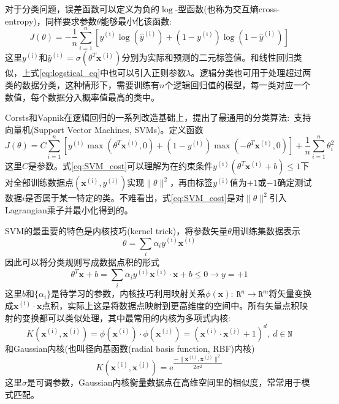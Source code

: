 对于分类问题，误差函数可以定义为负的$\log$-型函数(也称为交互熵\textrm{cross-entropy})，同样要求参数$\theta$能够最小化该函数:
\begin{equation}
	J(\theta) = -\dfrac1n\sum_{i=1}^n[y^{(\mathrm{i})}\log(\hat{y}^{(\mathrm{i})})+(1-y^{(\mathrm{i})})\log(1-\hat{y}^{(\mathrm{i})})]
	\label{eq:logstical_eq}
\end{equation}
这里$y^{(\mathrm{i})}$和$\hat{y}^{(\mathrm{i})}=\sigma(\theta^T\mathbf{x}^{(\mathrm{i})})$分别为实际和预测的二元标签值。和线性回归类似，上式\ref{eq:logstical_eq}中也可以引入正则参数$\lambda$。逻辑分类也可用于处理超过两类的数据分类，这种情形下，需要训练有$n$个逻辑回归值的模型，每一类对应一个数值，每个数据分入概率值最高的类中。

\textrm{Corsts}和\textrm{Vapnik}在逻辑回归的一系列改造基础上，提出了最通用的分类算法:~支持向量机\textrm{(Support Vector Machines, SVMs)}\cite{ML20-273_1995}。定义函数
\begin{equation}
	J(\theta)=C\sum_{i=1}^n[y^{(\mathrm{i})}\max(\theta^T\mathbf{x}^{(\mathrm{i})},0)+(1-y^{(\mathrm{i})})\max(-\theta^T\mathbf{x}^{(\mathrm{i})},0)]+\dfrac1n\sum_{i=1}^n\theta_i^2
	\label{eq:SVM_cost}
\end{equation}
这里$C$是参数。式\eqref{eq:SVM_cost}可以理解为在约束条件$y^{(\mathrm{i})}(\theta^T\mathbf{x}^{(\mathrm{i})}+b)\leqslant1$下对全部训练数据点$(\mathbf{x}^{(\mathrm{i})},y^{(\mathrm{i})})$实现$\|\theta\|^2$，再由标签$y^{(\mathrm{i})}$值为$+1$或$-1$确定测试数据$i$是否属于某一特定的类。不难看出，式\eqref{eq:SVM_cost}是对$\|\theta\|^2$引入\textrm{Lagrangian}乘子并最小化得到的。

\textrm{SVM}的最重要的特色是内核技巧\textrm{(kernel trick)}，将参数矢量$\theta$用训练集数据表示
\begin{displaymath}
	\theta=\sum_i\alpha_iy^{(\mathrm{i})}\mathbf{x}^{(\mathrm{i})}
\end{displaymath}
因此可以将分类规则写成数据点积的形式
\begin{equation}
	\theta^T\mathbf{x}+b=\sum_i\alpha_iy^{(\mathrm{i})}\mathbf{x}^{(\mathrm{i})}\cdot\mathbf{x}+b\leqslant0\rightarrow y=+1
	\label{eq:SVM_cp}
\end{equation}
这里$b$和$\{\alpha_i\}$是待学习的参数，内核技巧利用映射关系$\phi(\mathbf{x}):~\mathtt{R}^n\rightarrow\mathtt{R}^m$将矢量变换成$\mathbf{x}^{(\mathrm{i})}\cdot\mathbf{x}$点积，实际上这是将数据点映射到更高维度的空间中。所有矢量点积映射的变换都可以类似处理，其中最常用的内核为多项式内核:
\begin{displaymath}
	K(\mathbf{x}^{(\mathrm{i})},\mathbf{x}^{(\mathrm{j})})=\phi(\mathbf{x}^{(\mathrm{i})})\cdot\phi(\mathbf{x}^{(\mathrm{j})})=(\mathbf{x}^{(\mathrm{i})}\cdot\mathbf{x}^{(\mathrm{j})}+1)^d,~d\in\mathtt{N}
\end{displaymath}
和\textrm{Gaussian}内核(也叫径向基函数(\textrm{radial basis function, RBF})内核)
\begin{displaymath}
	K(\mathbf{x}^{(\mathrm{i})},\mathbf{x}^{(\mathrm{j})})=\mathrm{e}^{\dfrac{-\|\mathbf{x}^{(\mathrm{i})},\mathbf{x}^{(\mathrm{j})}\|^2}{2\sigma^2}}
\end{displaymath}
这里$\sigma$是可调参数，\textrm{Gaussian}内核衡量数据点在高维空间里的相似度，常常用于模式匹配。

